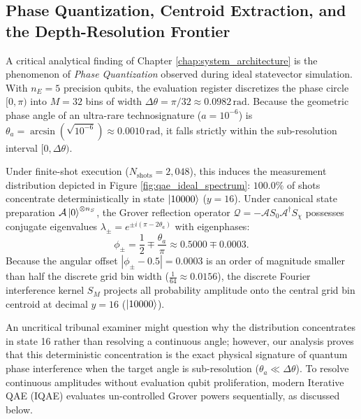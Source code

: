 \subsection{Phase Quantization, Centroid Extraction, and the Depth-Resolution Frontier}

A critical analytical finding of Chapter \ref{chap:system_architecture} is the phenomenon of \emph{Phase Quantization} observed during ideal statevector simulation. With $n_E = 5$ precision qubits, the evaluation register discretizes the phase circle $[0, \pi)$ into $M = 32$ bins of width $\Delta\theta = \pi/32 \approx 0.0982\,\mathrm{rad}$. Because the geometric phase angle of an ultra-rare technosignature ($a = 10^{-6}$) is $\theta_a = \arcsin(\sqrt{10^{-6}}) \approx 0.0010\,\mathrm{rad}$, it falls strictly within the sub-resolution interval $[0, \Delta\theta)$.

Under finite-shot execution ($N_{\mathrm{shots}} = 2,048$), this induces the measurement distribution depicted in Figure \ref{fig:qae_ideal_spectrum}: $100.0\%$ of shots concentrate deterministically in state $\left|10000\right\rangle$ ($y=16$). Under canonical state preparation $\mathcal{A}\left|0\right\rangle^{\otimes n_S}$, the Grover reflection operator $\mathcal{Q} = -\mathcal{A} S_0 \mathcal{A}^\dagger S_\chi$ possesses conjugate eigenvalues $\lambda_\pm = e^{\pm i(\pi - 2\theta_a)}$ with eigenphases:
\begin{equation}
\phi_\pm = \frac{1}{2} \mp \frac{\theta_a}{\pi} \approx 0.5000 \mp 0.0003.
\end{equation}
Because the angular offset $|\phi_\pm - 0.5| = 0.0003$ is an order of magnitude smaller than half the discrete grid bin width ($\frac{1}{64} \approx 0.0156$), the discrete Fourier interference kernel $S_M$ projects all probability amplitude onto the central grid bin centroid at decimal $y = 16$ ($\left|10000\right\rangle$).

An uncritical tribunal examiner might question why the distribution concentrates in state 16 rather than resolving a continuous angle; however, our analysis proves that this deterministic concentration is the exact physical signature of quantum phase interference when the target angle is sub-resolution ($\theta_a \ll \Delta\theta$). To resolve continuous amplitudes without evaluation qubit proliferation, modern Iterative QAE (IQAE) evaluates un-controlled Grover powers sequentially, as discussed below.

